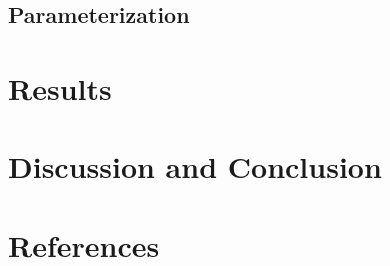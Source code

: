 \documentclass[11pt]{article}
\begin{document}
\subsection{Parameterization}



\section{Results}

\section{Discussion and Conclusion}





%
%
%
%
%
%


\section{References}



\end{document}

